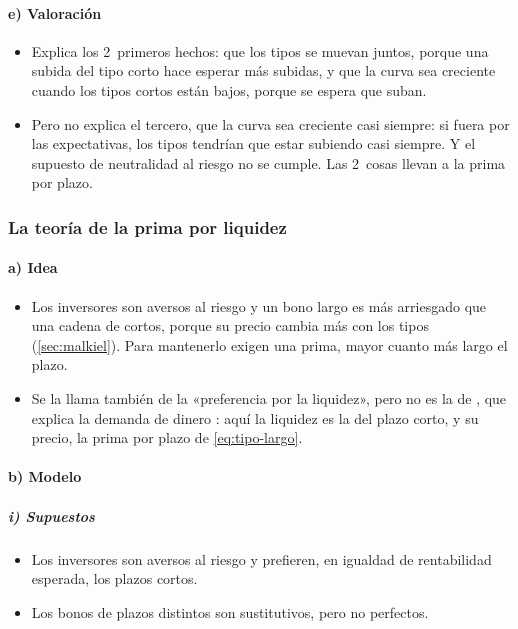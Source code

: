 \documentclass[11pt]{article}
\begin{document}
\paragraph{e) Valoración}
\begin{itemize}
\item Explica los 2~primeros hechos: que los tipos se muevan juntos, porque una subida del tipo corto hace esperar más subidas, y que la curva sea creciente cuando los tipos cortos están bajos, porque se espera que suban.
\item Pero no explica el tercero, que la curva sea creciente casi siempre: si fuera por las expectativas, los tipos tendrían que estar subiendo casi siempre. Y el supuesto de neutralidad al riesgo no se cumple. Las 2~cosas llevan a la prima por plazo.
\end{itemize}

\subsubsection{La teoría de la prima por liquidez}\label{sec:liquidez}

\paragraph{a) Idea}
\begin{itemize}
\item Los inversores son aversos al riesgo y un bono largo es más arriesgado que una cadena de cortos, porque su precio cambia más con los tipos (\ref{sec:malkiel}). Para mantenerlo exigen una prima, mayor cuanto más largo el plazo\nocite{Hicks1939Value}.
\item Se la llama también de la «preferencia por la liquidez», pero no es la de , que explica la demanda de dinero : aquí la liquidez es la del plazo corto, y su precio, la prima por plazo de \eqref{eq:tipo-largo}.
\end{itemize}

\paragraph{b) Modelo}
\subparagraph{i) Supuestos}
\begin{itemize}
\item Los inversores son aversos al riesgo y prefieren, en igualdad de rentabilidad esperada, los plazos cortos.
\item Los bonos de plazos distintos son sustitutivos, pero no perfectos.
\end{itemize}
\end{document}
